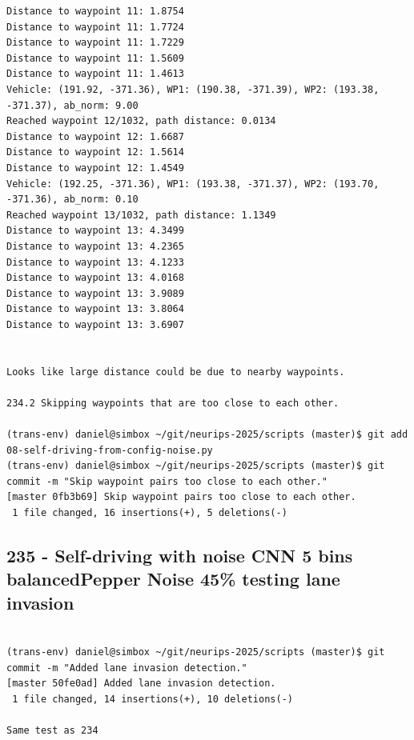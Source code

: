 \begin{verbatim}
Distance to waypoint 11: 1.8754
Distance to waypoint 11: 1.7724
Distance to waypoint 11: 1.7229
Distance to waypoint 11: 1.5609
Distance to waypoint 11: 1.4613
Vehicle: (191.92, -371.36), WP1: (190.38, -371.39), WP2: (193.38, -371.37), ab_norm: 9.00
Reached waypoint 12/1032, path distance: 0.0134
Distance to waypoint 12: 1.6687
Distance to waypoint 12: 1.5614
Distance to waypoint 12: 1.4549
Vehicle: (192.25, -371.36), WP1: (193.38, -371.37), WP2: (193.70, -371.36), ab_norm: 0.10
Reached waypoint 13/1032, path distance: 1.1349
Distance to waypoint 13: 4.3499
Distance to waypoint 13: 4.2365
Distance to waypoint 13: 4.1233
Distance to waypoint 13: 4.0168
Distance to waypoint 13: 3.9089
Distance to waypoint 13: 3.8064
Distance to waypoint 13: 3.6907


Looks like large distance could be due to nearby waypoints.

234.2 Skipping waypoints that are too close to each other.

(trans-env) daniel@simbox ~/git/neurips-2025/scripts (master)$ git add 08-self-driving-from-config-noise.py 
(trans-env) daniel@simbox ~/git/neurips-2025/scripts (master)$ git commit -m "Skip waypoint pairs too close to each other."
[master 0fb3b69] Skip waypoint pairs too close to each other.
 1 file changed, 16 insertions(+), 5 deletions(-)

\end{verbatim}

\subsection{235 - Self-driving with noise CNN 5 bins balancedPepper Noise 45\% testing lane invasion}
\label{app_res:235}

\begin{verbatim}

(trans-env) daniel@simbox ~/git/neurips-2025/scripts (master)$ git commit -m "Added lane invasion detection."
[master 50fe0ad] Added lane invasion detection.
 1 file changed, 14 insertions(+), 10 deletions(-)   

Same test as 234

\end{verbatim}

